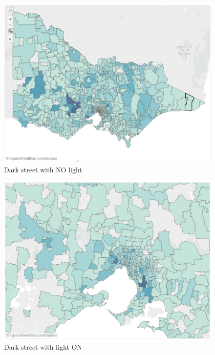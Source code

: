 \documentclass[10pt]{article}
\theoremstyle{definition}
\begin{document}
\begin{minipage}{\linewidth}
  	\centering
  \begin{minipage}{0.49\linewidth}
	\begin{figure}[H]
            \includegraphics[width=\linewidth]{images/darkNoLight.png}
			\caption{Dark street with NO light }
			\label{fig:darkStreetNoLight}
    \end{figure}
  \end{minipage}
  \hspace{0.0\linewidth}
  \begin{minipage}{0.49\linewidth}
     \begin{figure}[H]
            \includegraphics[width=\linewidth]{images/darkLightON.png}
			\caption{Dark street with light ON}
			\label{fig:darkStreetLightOn}
    \end{figure}
    \end{minipage}
\end{minipage}\\
\end{document}
